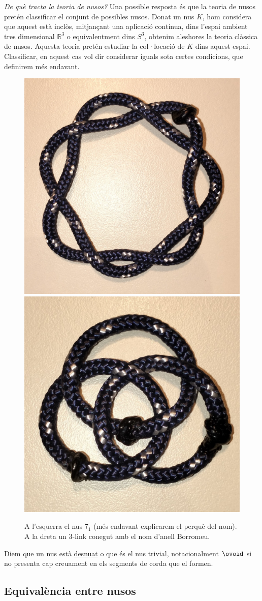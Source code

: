 \textit{De què tracta la teoria de nusos?}
Una possible resposta és que la teoria de nusos pretén classificar el conjunt de possibles nusos. Donat un nus $K$, hom considera que aquest està inclòs, mitjançant una aplicació contínua, dins l'espai ambient tres dimensional $\mathbb{R}^3$ o equivalentment dins $S^3$, obtenim aleshores la teoria clàssica de nusos. Aquesta teoria pretén estudiar la col·locació de $K$ dins aquest espai. Classificar, en aquest cas vol dir considerar iguals sota certes condicions, que definirem més endavant.

\begin{figure}
	\centering
	\includegraphics[width=0.45\linewidth]{img/7_1.jpg}
	\includegraphics[width=0.45\linewidth]{img/anell borromeu.jpg}
	\caption{A l'esquerra el nus $7_1$ (més endavant explicarem el perquè del nom). A la dreta un 3-link conegut amb el nom d'anell Borromeu. 
	}\label{fig:exemplesdenusosenmatematiques}
\end{figure}

\begin{definition}
	Diem que un nus està \underline{desnuat} o que és el nus trivial, notacionalment $\ovoid$ si no presenta cap creuament en els segments de corda que el formen.
\end{definition}

\subsection{Equivalència entre nusos}\label{Equivalència entre nusos}

